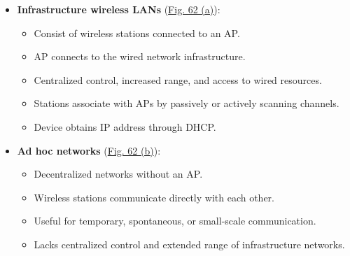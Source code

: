 \vspace{-1.5 em}
\begin{itemize}
    \item \textbf{Infrastructure wireless LANs} (\hyperref[fig:WiFi-net-b]{Fig. 62 (a)}):
    \begin{itemize}[noitemsep, nolistsep] \small
        \item Consist of wireless stations connected to an AP.
        \item AP connects to the wired network infrastructure.
        \item Centralized control, increased range, and access to wired resources.
        \item Stations associate with APs by passively or actively scanning channels.
        \item Device obtains IP address through DHCP.
    \end{itemize}

    \item \textbf{Ad hoc networks} (\hyperref[fig:WiFi-net-b]{Fig. 62 (b)}):
    \begin{itemize}[noitemsep, nolistsep] \small
        \item Decentralized networks without an AP.
        \item Wireless stations communicate directly with each other.
        \item Useful for temporary, spontaneous, or small-scale communication.
        \item Lacks centralized control and extended range of infrastructure networks.
    \end{itemize}
\end{itemize}

\renewcommand*{\thefootnote}{\fnsymbol{footnote}}
\renewcommand*{\thefootnote}{\arabic{footnote}}

